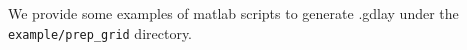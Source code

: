 We provide some examples of matlab scripts to generate .gdlay under the \texttt{example/prep\_grid} directory.

%
%
%
%
